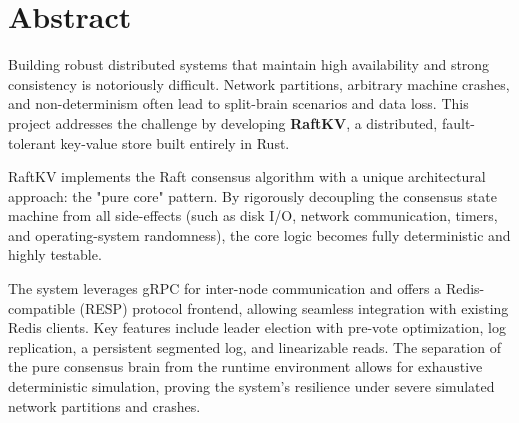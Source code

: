 \documentclass[12pt,a4paper]{report}
\begin{document}
\newpage

\chapter*{Abstract}

Building robust distributed systems that maintain high availability and strong consistency is notoriously difficult. Network partitions, arbitrary machine crashes, and non-determinism often lead to split-brain scenarios and data loss. This project addresses the challenge by developing \textbf{RaftKV}, a distributed, fault-tolerant key-value store built entirely in Rust. 

RaftKV implements the Raft consensus algorithm with a unique architectural approach: the "pure core" pattern. By rigorously decoupling the consensus state machine from all side-effects (such as disk I/O, network communication, timers, and operating-system randomness), the core logic becomes fully deterministic and highly testable. 

The system leverages gRPC for inter-node communication and offers a Redis-compatible (RESP) protocol frontend, allowing seamless integration with existing Redis clients. Key features include leader election with pre-vote optimization, log replication, a persistent segmented log, and linearizable reads. The separation of the pure consensus brain from the runtime environment allows for exhaustive deterministic simulation, proving the system's resilience under severe simulated network partitions and crashes.

\newpage

\tableofcontents
\newpage

\listoffigures
{}
\newpage

\listoftables
{}
\newpage

\end{document}
